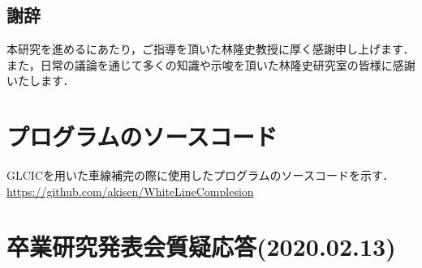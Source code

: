 \documentclass[a4j, 11pt]{jreport}
\begin{document}
\newpage
\section*{謝辞}
本研究を進めるにあたり，ご指導を頂いた林隆史教授に厚く感謝申し上げます．
また，日常の議論を通じて多くの知識や示唆を頂いた林隆史研究室の皆様に感謝いたします．

\appendix
\chapter{プログラムのソースコード}
GLCICを用いた車線補完の際に使用したプログラムのソースコードを示す．\\
\url{https://github.com/akisen/WhiteLineComplesion}
\chapter{卒業研究発表会質疑応答(2020.02.13)}
\end{document}
